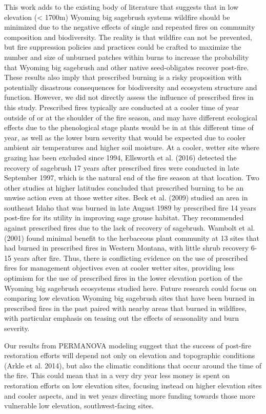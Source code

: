 \documentclass[12pt,]{article}
\begin{document}
This work adds to the existing body of literature that suggests that in
low elevation (\textless{} 1700m) Wyoming big sagebrush systems wildfire
should be minimized due to the negative effects of single and repeated
fires on community composition and biodiversity. The reality is that
wildfire can not be prevented, but fire suppression policies and
practices could be crafted to maximize the number and size of unburned
patches within burns to increase the probability that Wyoming big
sagebrush and other native seed-obligates recover post-fire. These
results also imply that prescribed burning is a risky proposition with
potentially disastrous consequences for biodiversity and ecosystem
structure and function. However, we did not directly assess the
influence of prescribed fires in this study. Prescribed fires typically
are conducted at a cooler time of year outside of or at the shoulder of
the fire season, and may have different ecological effects due to the
phenological stage plants would be in at this different time of year, as
well as the lower burn severity that would be expected due to cooler
ambient air temperatures and higher soil moisture. At a cooler, wetter
site where grazing has been excluded since 1994, Ellsworth et al. (2016)
detected the recovery of sagebrush 17 years after prescribed fires were
conducted in late September 1997, which is the natural end of the fire
season at that location. Two other studies at higher latitudes concluded
that prescribed burning to be an unwise action even at those wetter
sites. Beck et al. (2009) studied an area in southeast Idaho that was
burned in late August 1989 by prescribed fire 14 years post-fire for its
utility in improving sage grouse habitat. They recommended against
prescribed fires due to the lack of recovery of sagebrush. Wambolt et
al. (2001) found minimal benefit to the herbaceous plant community at 13
sites that had burned in prescribed fires in Western Montana, with
little shrub recovery 6-15 years after fire. Thus, there is conflicting
evidence on the use of prescribed fires for management objectives even
at cooler wetter sites, providing less optimism for the use of
prescribed fires in the lower elevation portion of the Wyoming big
sagebrush ecosystems studied here. Future research could focus on
comparing low elevation Wyoming big sagebrush sites that have been
burned in prescribed fires in the past paired with nearby areas that
burned in wildfires, with particular emphasis on teasing out the effects
of seasonality and burn severity.

Our results from PERMANOVA modeling suggest that the success of
post-fire restoration efforts will depend not only on elevation and
topographic conditions (Arkle et al. 2014), but also the climatic
conditions that occur around the time of the fire. This could mean that
in a very dry year less money is spent on restoration efforts on low
elevation sites, focusing instead on higher elevation sites and cooler
aspects, and in wet years directing more funding towards those more
vulnerable low elevation, southwest-facing sites.
\end{document}
